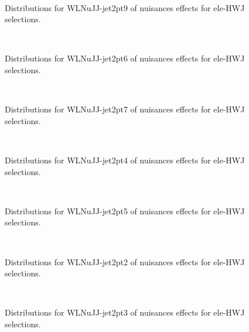 \begin{figure}[htbp]  
\centering 
\\ 
\caption{ 
   Distributions for WLNuJJ-jet2pt9 of nuisances effects for ele-HWJ selections.
} 
\label{fig:WLNuJJ_jet2pt9_ele_HWJ} 
\end{figure} 




\begin{figure}[htbp]  
\centering 
\\ 
\caption{ 
   Distributions for WLNuJJ-jet2pt6 of nuisances effects for ele-HWJ selections.
} 
\label{fig:WLNuJJ_jet2pt6_ele_HWJ} 
\end{figure} 




\begin{figure}[htbp]  
\centering 
\\ 
\caption{ 
   Distributions for WLNuJJ-jet2pt7 of nuisances effects for ele-HWJ selections.
} 
\label{fig:WLNuJJ_jet2pt7_ele_HWJ} 
\end{figure} 




\begin{figure}[htbp]  
\centering 
\\ 
\caption{ 
   Distributions for WLNuJJ-jet2pt4 of nuisances effects for ele-HWJ selections.
} 
\label{fig:WLNuJJ_jet2pt4_ele_HWJ} 
\end{figure} 




\begin{figure}[htbp]  
\centering 
\\ 
\caption{ 
   Distributions for WLNuJJ-jet2pt5 of nuisances effects for ele-HWJ selections.
} 
\label{fig:WLNuJJ_jet2pt5_ele_HWJ} 
\end{figure} 




\begin{figure}[htbp]  
\centering 
\\ 
\caption{ 
   Distributions for WLNuJJ-jet2pt2 of nuisances effects for ele-HWJ selections.
} 
\label{fig:WLNuJJ_jet2pt2_ele_HWJ} 
\end{figure} 




\begin{figure}[htbp]  
\centering 
\\ 
\caption{ 
   Distributions for WLNuJJ-jet2pt3 of nuisances effects for ele-HWJ selections.
} 
\label{fig:WLNuJJ_jet2pt3_ele_HWJ} 
\end{figure} 




